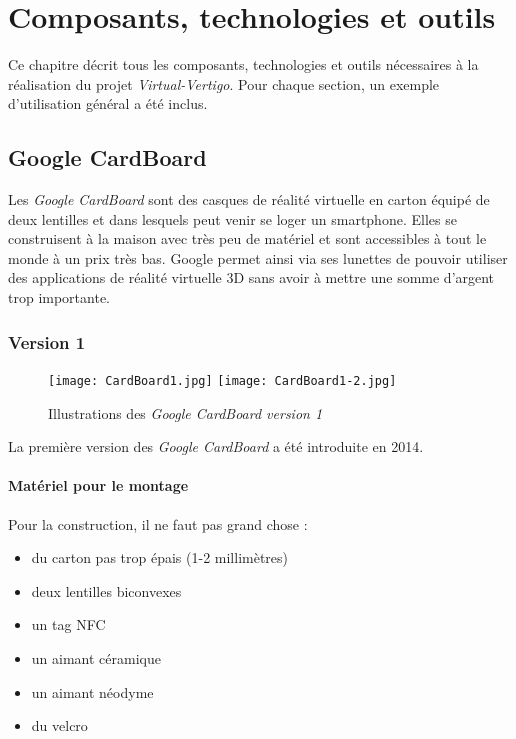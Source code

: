 \chapter{Composants, technologies et outils}  \label{outils}
Ce chapitre décrit tous les composants, technologies et outils nécessaires à la réalisation du projet \textit{Virtual-Vertigo}. Pour chaque section, un exemple d'utilisation général a été inclus. 

\section{Google CardBoard} \label{cardboard}

Les \textit{Google CardBoard} sont des casques de réalité virtuelle en carton équipé de deux lentilles et dans lesquels peut venir se loger un \textsf{smartphone}. Elles se construisent à la maison avec très peu de matériel et sont accessibles à tout le monde à un prix très bas. Google permet ainsi via ses lunettes de pouvoir utiliser des applications de réalité virtuelle 3D sans avoir à mettre une somme d'argent trop importante.

\subsection*{Version 1}
\begin{figure}[h]
	\centering
		\texttt{[image: CardBoard1.jpg]}
		\texttt{[image: CardBoard1-2.jpg]}
	\caption{\label{CardBoard1} Illustrations des \textit{Google CardBoard version 1}}
\end{figure}

La première version des \textit{Google CardBoard} a été introduite en 2014.

\subsubsection{Matériel pour le montage}
Pour la construction, il ne faut pas grand chose :
\begin{itemize}
\item du carton pas trop épais (1-2 millimètres)
\item deux lentilles biconvexes
\item un tag NFC
\item un aimant céramique
\item un aimant néodyme
\item du velcro \\

\end{itemize}

